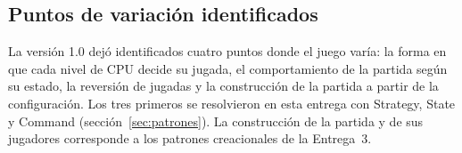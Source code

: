 \subsection{Puntos de variación identificados}

La versión 1.0 dejó identificados cuatro puntos donde el juego varía: la forma en que cada nivel de CPU decide su jugada, el comportamiento de la partida según su estado, la reversión de jugadas y la construcción de la partida a partir de la configuración. Los tres primeros se resolvieron en esta entrega con Strategy, State y Command (sección~\ref{sec:patrones}). La construcción de la partida y de sus jugadores corresponde a los patrones creacionales de la Entrega~3.
